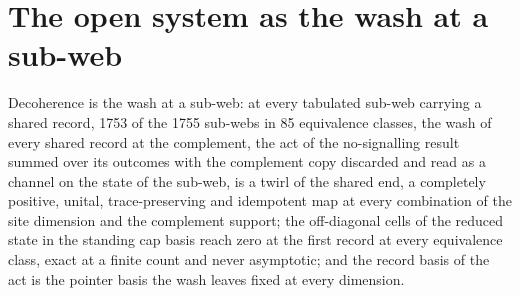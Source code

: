 \section{The open system as the wash at a sub-web}\label{mod:II-10-D536583-psyo-t1}
\begin{chtheorem}
Decoherence is the wash at a sub-web: at every tabulated sub-web carrying a shared record, 1753 of the 1755 sub-webs in 85 equivalence classes, the wash of every shared record at the complement, the act of the no-signalling result summed over its outcomes with the complement copy discarded and read as a channel on the state of the sub-web, is a twirl of the shared end, a completely positive, unital, trace-preserving and idempotent map at every combination of the site dimension and the complement support; the off-diagonal cells of the reduced state in the standing cap basis reach zero at the first record at every equivalence class, exact at a finite count and never asymptotic; and the record basis of the act is the pointer basis the wash leaves fixed at every dimension.
\end{chtheorem}
\chdeps{}{}
